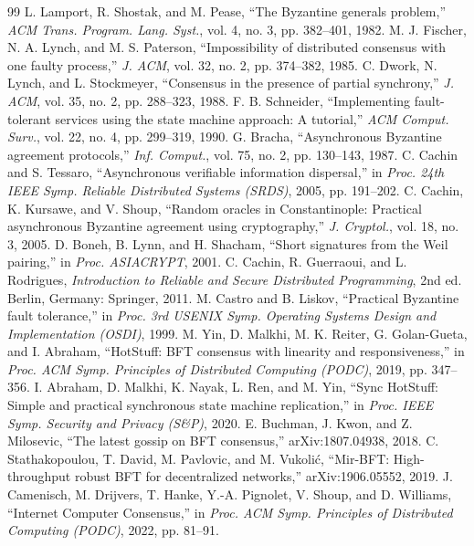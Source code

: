 \documentclass[UTF8,fontset=windows,a4paper,11pt]{ctexart}
\begin{document}
\begin{thebibliography}{99}
\setlength{\itemsep}{2pt plus 1pt}
 L. Lamport, R. Shostak, and M. Pease, “The Byzantine generals problem,” \textit{ACM Trans. Program. Lang. Syst.}, vol. 4, no. 3, pp. 382–401, 1982.
 M. J. Fischer, N. A. Lynch, and M. S. Paterson, “Impossibility of distributed consensus with one faulty process,” \textit{J. ACM}, vol. 32, no. 2, pp. 374–382, 1985.
 C. Dwork, N. Lynch, and L. Stockmeyer, “Consensus in the presence of partial synchrony,” \textit{J. ACM}, vol. 35, no. 2, pp. 288–323, 1988.
 F. B. Schneider, “Implementing fault-tolerant services using the state machine approach: A tutorial,” \textit{ACM Comput. Surv.}, vol. 22, no. 4, pp. 299–319, 1990.
 G. Bracha, “Asynchronous Byzantine agreement protocols,” \textit{Inf. Comput.}, vol. 75, no. 2, pp. 130–143, 1987.
 C. Cachin and S. Tessaro, “Asynchronous verifiable information dispersal,” in \textit{Proc. 24th IEEE Symp. Reliable Distributed Systems (SRDS)}, 2005, pp. 191–202.
 C. Cachin, K. Kursawe, and V. Shoup, “Random oracles in Constantinople: Practical asynchronous Byzantine agreement using cryptography,” \textit{J. Cryptol.}, vol. 18, no. 3, 2005.
 D. Boneh, B. Lynn, and H. Shacham, “Short signatures from the Weil pairing,” in \textit{Proc. ASIACRYPT}, 2001.
 C. Cachin, R. Guerraoui, and L. Rodrigues, \textit{Introduction to Reliable and Secure Distributed Programming}, 2nd ed. Berlin, Germany: Springer, 2011.
 M. Castro and B. Liskov, “Practical Byzantine fault tolerance,” in \textit{Proc. 3rd USENIX Symp. Operating Systems Design and Implementation (OSDI)}, 1999.
 M. Yin, D. Malkhi, M. K. Reiter, G. Golan-Gueta, and I. Abraham, “HotStuff: BFT consensus with linearity and responsiveness,” in \textit{Proc. ACM Symp. Principles of Distributed Computing (PODC)}, 2019, pp. 347–356.
 I. Abraham, D. Malkhi, K. Nayak, L. Ren, and M. Yin, “Sync HotStuff: Simple and practical synchronous state machine replication,” in \textit{Proc. IEEE Symp. Security and Privacy (S\&P)}, 2020.
 E. Buchman, J. Kwon, and Z. Milosevic, “The latest gossip on BFT consensus,” arXiv:1807.04938, 2018.
 C. Stathakopoulou, T. David, M. Pavlovic, and M. Vukolić, “Mir-BFT: High-throughput robust BFT for decentralized networks,” arXiv:1906.05552, 2019.
 J. Camenisch, M. Drijvers, T. Hanke, Y.-A. Pignolet, V. Shoup, and D. Williams, “Internet Computer Consensus,” in \textit{Proc. ACM Symp. Principles of Distributed Computing (PODC)}, 2022, pp. 81–91.

\end{thebibliography}
\end{document}
